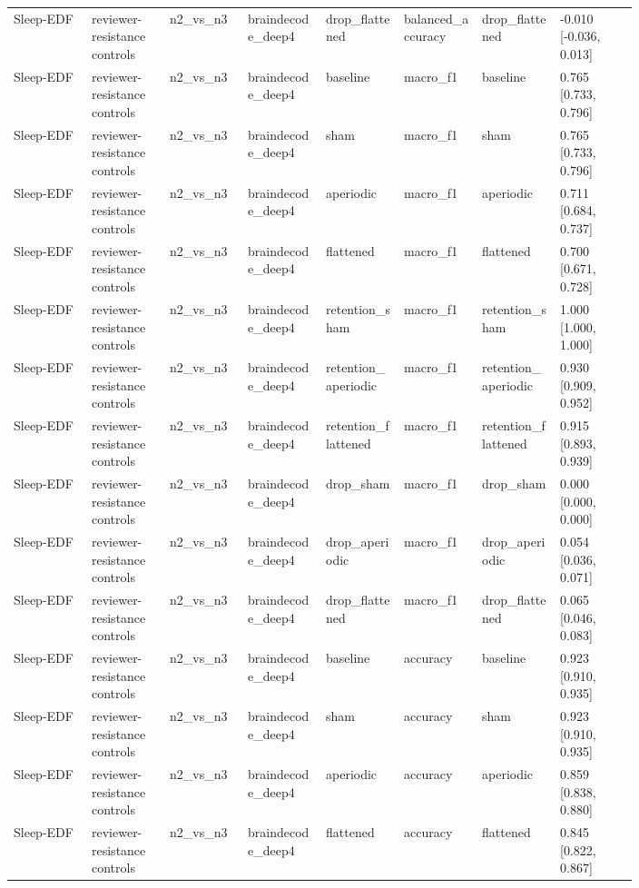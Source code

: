 \begin{longtable}{p{0.10\linewidth}p{0.10\linewidth}p{0.10\linewidth}p{0.10\linewidth}p{0.10\linewidth}p{0.10\linewidth}p{0.10\linewidth}p{0.10\linewidth}}
Sleep-EDF & reviewer-resistance controls & n2\_vs\_n3 & braindecode\_deep4 & drop\_flattened & balanced\_accuracy & drop\_flattened & -0.010 [-0.036, 0.013]\\
Sleep-EDF & reviewer-resistance controls & n2\_vs\_n3 & braindecode\_deep4 & baseline & macro\_f1 & baseline & 0.765 [0.733, 0.796]\\
Sleep-EDF & reviewer-resistance controls & n2\_vs\_n3 & braindecode\_deep4 & sham & macro\_f1 & sham & 0.765 [0.733, 0.796]\\
Sleep-EDF & reviewer-resistance controls & n2\_vs\_n3 & braindecode\_deep4 & aperiodic & macro\_f1 & aperiodic & 0.711 [0.684, 0.737]\\
Sleep-EDF & reviewer-resistance controls & n2\_vs\_n3 & braindecode\_deep4 & flattened & macro\_f1 & flattened & 0.700 [0.671, 0.728]\\
Sleep-EDF & reviewer-resistance controls & n2\_vs\_n3 & braindecode\_deep4 & retention\_sham & macro\_f1 & retention\_sham & 1.000 [1.000, 1.000]\\
Sleep-EDF & reviewer-resistance controls & n2\_vs\_n3 & braindecode\_deep4 & retention\_aperiodic & macro\_f1 & retention\_aperiodic & 0.930 [0.909, 0.952]\\
Sleep-EDF & reviewer-resistance controls & n2\_vs\_n3 & braindecode\_deep4 & retention\_flattened & macro\_f1 & retention\_flattened & 0.915 [0.893, 0.939]\\
Sleep-EDF & reviewer-resistance controls & n2\_vs\_n3 & braindecode\_deep4 & drop\_sham & macro\_f1 & drop\_sham & 0.000 [0.000, 0.000]\\
Sleep-EDF & reviewer-resistance controls & n2\_vs\_n3 & braindecode\_deep4 & drop\_aperiodic & macro\_f1 & drop\_aperiodic & 0.054 [0.036, 0.071]\\
Sleep-EDF & reviewer-resistance controls & n2\_vs\_n3 & braindecode\_deep4 & drop\_flattened & macro\_f1 & drop\_flattened & 0.065 [0.046, 0.083]\\
Sleep-EDF & reviewer-resistance controls & n2\_vs\_n3 & braindecode\_deep4 & baseline & accuracy & baseline & 0.923 [0.910, 0.935]\\
Sleep-EDF & reviewer-resistance controls & n2\_vs\_n3 & braindecode\_deep4 & sham & accuracy & sham & 0.923 [0.910, 0.935]\\
Sleep-EDF & reviewer-resistance controls & n2\_vs\_n3 & braindecode\_deep4 & aperiodic & accuracy & aperiodic & 0.859 [0.838, 0.880]\\
Sleep-EDF & reviewer-resistance controls & n2\_vs\_n3 & braindecode\_deep4 & flattened & accuracy & flattened & 0.845 [0.822, 0.867]\\

\end{longtable}
